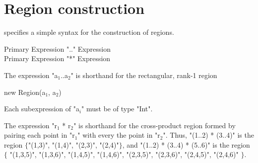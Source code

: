 \section{Region construction}\label{region-syntax}


\Xten{} specifies a simple syntax for the construction of regions.

\begin{grammar}
Primary \: Expression \xcd".." Expression \\
Primary \: Expression \xcd"*" Expression \\
\end{grammar}

The expression \xcdmath"a$_1$..a$_2$"
is shorthand for the rectangular, rank-1 region
\begin{xtenmath}
new Region(a$_1$, a$_2$)
\end{xtenmath}
Each subexpression of \xcdmath"a$_i$" must be of type \xcd"Int".

The expression \xcdmath"r$_1$ * r$_2$" is shorthand for the
cross-product region formed by pairing each point in \xcdmath"r$_1$"
with every the point in \xcdmath"r$_2$".
Thus, \xcd"(1..2) * (3..4)"
is the region $\{$\xcd"(1,3)", \xcd"(1,4)", \xcd"(2,3)",
\xcd"(2,4)"$\}$,
and \xcd"(1..2) * (3..4) * (5..6)"
is the region
$\{$%
\xcd"(1,3,5)",
\xcd"(1,3,6)",
\xcd"(1,4,5)",
\xcd"(1,4,6)",
\xcd"(2,3,5)",
\xcd"(2,3,6)",
\xcd"(2,4,5)",
\xcd"(2,4,6)"%
$\}$.

